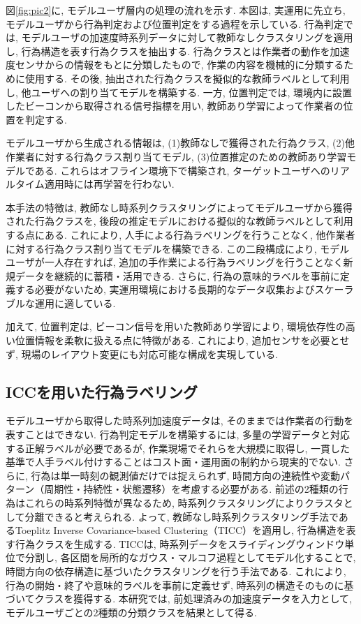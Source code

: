 \documentclass[a4paper,12pt]{jreport}
\begin{document}
図\ref{fig:pic2}に, モデルユーザ層内の処理の流れを示す. 本図は, 実運用に先立ち, モデルユーザから行為判定および位置判定をする過程を示している. 行為判定では, モデルユーザの加速度時系列データに対して教師なしクラスタリングを適用し, 行為構造を表す行為クラスを抽出する. 行為クラスとは作業者の動作を加速度センサからの情報をもとに分類したもので, 作業の内容を機械的に分類するために使用する. その後, 抽出された行為クラスを擬似的な教師ラベルとして利用し, 他ユーザへの割り当てモデルを構築する. 一方, 位置判定では, 環境内に設置したビーコンから取得される信号指標を用い, 教師あり学習によって作業者の位置を判定する. 

モデルユーザから生成される情報は, (1)教師なしで獲得された行為クラス, (2)他作業者に対する行為クラス割り当てモデル, (3)位置推定のための教師あり学習モデルである. これらはオフライン環境下で構築され, ターゲットユーザへのリアルタイム適用時には再学習を行わない. 

本手法の特徴は, 教師なし時系列クラスタリングによってモデルユーザから獲得された行為クラスを, 後段の推定モデルにおける擬似的な教師ラベルとして利用する点にある. これにより, 人手による行為ラベリングを行うことなく, 他作業者に対する行為クラス割り当てモデルを構築できる. この二段構成により, モデルユーザが一人存在すれば, 追加の手作業による行為ラベリングを行うことなく新規データを継続的に蓄積・活用できる. さらに, 行為の意味的ラベルを事前に定義する必要がないため, 実運用環境における長期的なデータ収集およびスケーラブルな運用に適している. 

加えて, 位置判定は, ビーコン信号を用いた教師あり学習により, 環境依存性の高い位置情報を柔軟に扱える点に特徴がある. これにより, 追加センサを必要とせず, 現場のレイアウト変更にも対応可能な構成を実現している. 

\subsection{ICCを用いた行為ラベリング}
モデルユーザから取得した時系列加速度データは, そのままでは作業者の行動を表すことはできない. 行為判定モデルを構築するには, 多量の学習データと対応する正解ラベルが必要であるが, 作業現場でそれらを大規模に取得し, 一貫した基準で人手ラベル付けすることはコスト面・運用面の制約から現実的でない. さらに, 行為は単一時刻の観測値だけでは捉えられず, 時間方向の連続性や変動パターン（周期性・持続性・状態遷移）を考慮する必要がある. 前述の2種類の行為はこれらの時系列特徴が異なるため, 時系列クラスタリングによりクラスタとして分離できると考えられる. よって, 教師なし時系列クラスタリング手法であるToeplitz Inverse Covariance-based Clustering（TICC）を適用し, 行為構造を表す行為クラスを生成する. TICCは, 時系列データをスライディングウィンドウ単位で分割し, 各区間を局所的なガウス・マルコフ過程としてモデル化することで, 時間方向の依存構造に基づいたクラスタリングを行う手法である. これにより, 行為の開始・終了や意味的ラベルを事前に定義せず, 時系列の構造そのものに基づいてクラスを獲得する. 本研究では, 前処理済みの加速度データを入力として, モデルユーザごとの2種類の分類クラスを結果として得る. 
\end{document}
